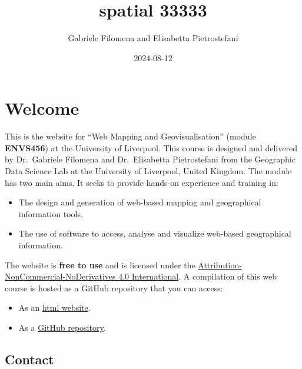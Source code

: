 \documentclass[
  letterpaper,
  DIV=11,
  numbers=noendperiod]{scrreprt}
\title{spatial 33333}
\author{Gabriele Filomena and Elisabetta Pietrostefani}
\date{2024-08-12}
\providecommand{\tightlist}{%
  \setlength{\itemsep}{0pt}\setlength{\parskip}{0pt}}\usepackage{longtable,booktabs,array}
\renewcommand*\contentsname{Table of contents}
\newcommand\contentsname{Table of contents}
\begin{document}
\maketitle

\renewcommand*\contentsname{Table of contents}
{
\hypersetup{linkcolor=}
\setcounter{tocdepth}{2}
\tableofcontents
}

\chapter*{Welcome}\label{welcome}


This is the website for ``Web Mapping and Geovisualisation'' (module
\textbf{ENVS456}) at the University of Liverpool. This course is
designed and delivered by Dr.~Gabriele Filomena and Dr.~Elisabetta
Pietrostefani from the Geographic Data Science Lab at the University of
Liverpool, United Kingdom. The module has two main aims. It seeks to
provide hands-on experience and training in:

\begin{itemize}
\tightlist
\item
  The design and generation of web-based mapping and geographical
  information tools.
\item
  The use of software to access, analyse and visualize web-based
  geographical information.
\end{itemize}

The website is \textbf{free to use} and is licensed under the
\href{https://creativecommons.org/licenses/by-nc-nd/4.0/}{Attribution-NonCommercial-NoDerivatives
4.0 International}. A compilation of this web course is hosted as a
GitHub repository that you can access:

\begin{itemize}
\tightlist
\item
  As an \href{https://gdsl-ul.github.io/wma}{html website}.
\item
  As a \href{https://github.com/GDSL-UL/wma}{GitHub repository}.
\end{itemize}

\section*{Contact}\label{contact}

\end{document}
